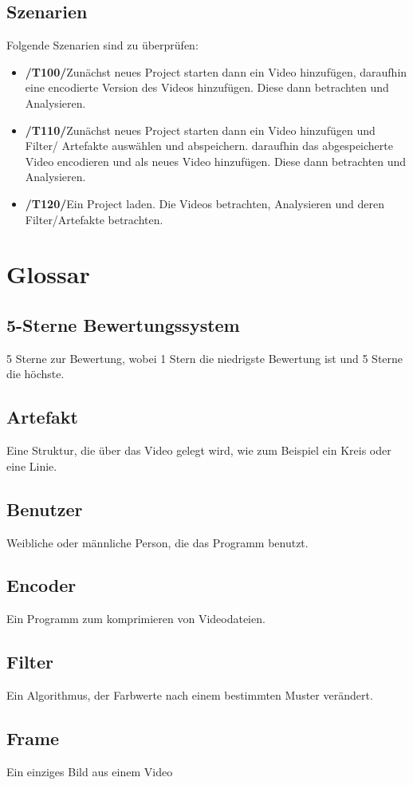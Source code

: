\documentclass[parskip=full]{scrartcl}
\begin{document}
\subsection{Szenarien}
Folgende Szenarien sind zu überprüfen:
\begin{itemize}
\item[]\textbf{/T100/}\qquad Zunächst neues Project starten dann ein Video hinzufügen, daraufhin eine encodierte Version des Videos hinzufügen. Diese dann betrachten und Analysieren.
\item[]\textbf{/T110/}\qquad Zunächst neues Project starten dann ein Video hinzufügen und Filter/ Artefakte auswählen und abspeichern. daraufhin das abgespeicherte Video encodieren und als neues Video hinzufügen. Diese dann betrachten und Analysieren.
\item[]\textbf{/T120/}\qquad Ein Project laden. Die Videos betrachten, Analysieren und deren Filter/Artefakte betrachten.
\end{itemize}
\section{Glossar}
\subsection*{5-Sterne Bewertungssystem}  
5 Sterne zur Bewertung, wobei 1 Stern die niedrigste Bewertung ist und 5 Sterne die höchste.

\subsection*{Artefakt} Eine Struktur, die über das Video gelegt wird, wie zum Beispiel ein Kreis oder eine Linie.
\subsection*{Benutzer} 
Weibliche oder männliche Person, die das Programm benutzt.
\subsection*{Encoder} 
Ein Programm zum komprimieren von Videodateien.
\subsection*{Filter} 
Ein Algorithmus, der Farbwerte nach einem bestimmten Muster verändert.
\subsection*{Frame}
Ein einziges Bild aus einem Video
\end{document}
